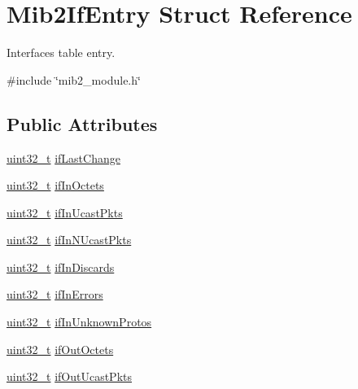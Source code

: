 \hypertarget{structMib2IfEntry}{}\section{Mib2\+If\+Entry Struct Reference}
\label{structMib2IfEntry}


Interfaces table entry.  




{\ttfamily \#include \char`\"{}mib2\+\_\+module.\+h\char`\"{}}

\subsection*{Public Attributes}
\begin{DoxyCompactItemize}
\item 
\hyperlink{stdint_8h_a435d1572bf3f880d55459d9805097f62}{uint32\+\_\+t} \hyperlink{structMib2IfEntry_a1dfe652178f86a79efee8ae7daf7dcb7}{if\+Last\+Change}
\item 
\hyperlink{stdint_8h_a435d1572bf3f880d55459d9805097f62}{uint32\+\_\+t} \hyperlink{structMib2IfEntry_a04cf847ddc56927770c1f937e7cff00c}{if\+In\+Octets}
\item 
\hyperlink{stdint_8h_a435d1572bf3f880d55459d9805097f62}{uint32\+\_\+t} \hyperlink{structMib2IfEntry_a51dccd5cb6926e300a55827be954b942}{if\+In\+Ucast\+Pkts}
\item 
\hyperlink{stdint_8h_a435d1572bf3f880d55459d9805097f62}{uint32\+\_\+t} \hyperlink{structMib2IfEntry_a70e3bb263cfa664f89b4a0f799ac6924}{if\+In\+N\+Ucast\+Pkts}
\item 
\hyperlink{stdint_8h_a435d1572bf3f880d55459d9805097f62}{uint32\+\_\+t} \hyperlink{structMib2IfEntry_ae278c92618145fa46b3af6e762f4149b}{if\+In\+Discards}
\item 
\hyperlink{stdint_8h_a435d1572bf3f880d55459d9805097f62}{uint32\+\_\+t} \hyperlink{structMib2IfEntry_a3e45ee0613b5ca08e6209015cdafcdd5}{if\+In\+Errors}
\item 
\hyperlink{stdint_8h_a435d1572bf3f880d55459d9805097f62}{uint32\+\_\+t} \hyperlink{structMib2IfEntry_aa8a17af4b37a02711289091c88ad22ff}{if\+In\+Unknown\+Protos}
\item 
\hyperlink{stdint_8h_a435d1572bf3f880d55459d9805097f62}{uint32\+\_\+t} \hyperlink{structMib2IfEntry_aab31aeba2f9e23bd19178563b44f8cef}{if\+Out\+Octets}
\item 
\hyperlink{stdint_8h_a435d1572bf3f880d55459d9805097f62}{uint32\+\_\+t} \hyperlink{structMib2IfEntry_a80688af5872a392872a99a0ff8078510}{if\+Out\+Ucast\+Pkts}

\end{DoxyCompactItemize}
